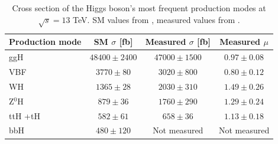 \begin{table}[ht]
    \centering
    \begin{tabular}{|l|c|c|c|}
        \hline
        \cellcolor{lightgray}Production mode & \cellcolor{lightgray} SM $\sigma$ [fb] & \cellcolor{lightgray} Measured $\sigma$ [fb] & \cellcolor{lightgray} Measured $\mu$ \\ \hline
        ggH                         & $48400 \pm 2400$          & $47000 \pm 1500$          & $0.97 \pm 0.08$           \\
        VBF                         & $3770 \pm 80$             & $3020 \pm 800$            & $0.80 \pm 0.12$    \\
        WH                          & $1365  \pm 28$            & $2030  \pm 310$           & $1.49 \pm 0.26$     \\
        Z$^0$H                      & $879  \pm 36$             & $1760  \pm 290$           & $1.29 \pm 0.24$    \\
        ttH +tH                     & $582  \pm 61$             & $658  \pm 36$             & $1.13 \pm 0.18$    \\
        bbH                         & $480  \pm 120$            & Not measured       & Not measured \\ \hline
    \end{tabular}
    \caption{Cross section of the Higgs boson's most frequent production modes at $\sqrt{s} = 13$ TeV. SM values from \cite{LHCHiggsCrossSectionWorkingGroup:2016ypw}, measured values from \cite{CMS:2022dwd}.}
    \label{tab:Higgs_production}
\end{table}

